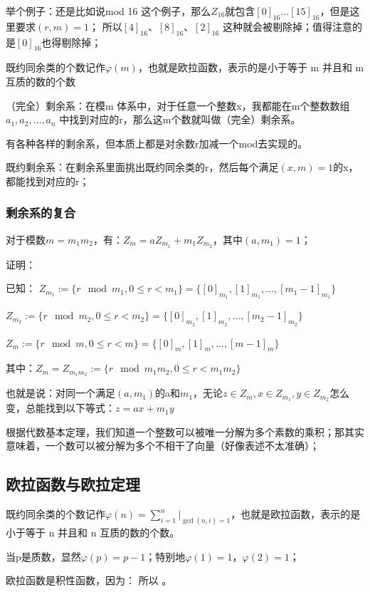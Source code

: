 \documentclass[12pt]{article}
\begin{document}
举个例子：还是比如说mod 16 这个例子，那么$Z_{16}$就包含$[0]_{16} \dots [15]_{16}$，但是这里要求$(r,m)=1$；
所以$[4]_{16}$、$[8]_{16}$、$[2]_{16}$ 这种就会被剔除掉；值得注意的是$[0]_{16}$也得剔除掉；

既约同余类的个数记作$\varphi(m)$，也就是欧拉函数，表示的是小于等于 m 并且和 m 互质的数的个数


（完全）剩余系：在模m 体系中，对于任意一个整数x，我都能在m个整数数组 $a_1,a_2,\dots,a_n$ 中找到对应的r，那么这m个数就叫做（完全）剩余系。

有各种各样的剩余系，但本质上都是对余数r加减一个mod去实现的。

既约剩余系：在剩余系里面挑出既约同余类的r，然后每个满足$(x,m)=1$的x，都能找到对应的r；

\subsubsection{剩余系的复合}

对于模数$m=m_1m_2$，有：$Z_m=aZ_{m_1}+m_1Z_{m_2}$，其中$(a,m_1)=1$；

证明：

已知：
$Z_{m_1}:=\{r\mod m_1,0\leq r < m_1\}=\{[0]_{m_1},[1]_{m_1},\dots,[m_1-1]_{m_1}\}$

$Z_{m_2}:=\{r\mod m_2,0\leq r < m_2\}=\{[0]_{m_2},[1]_{m_2},\dots,[m_2-1]_{m_2}\}$

$Z_{m}:=\{r\mod m,0\leq r < m\}=\{[0]_{m},[1]_{m},\dots,[m-1]_{m}\}$

其中：$Z_{m}=Z_{m_1m_2}:=\{r\mod m_1m_2,0\leq r < m_1m_2\}$

也就是说：对同一个满足$(a,m_1)$的a和$m_1$，无论$z\in Z_m,x\in Z_{m_1},y\in Z_{m_2}$怎么变，总能找到以下等式：$z=ax+m_1y$

根据代数基本定理，我们知道一个整数可以被唯一分解为多个素数的乘积；那其实意味着，一个数可以被分解为多个不相干了向量（好像表述不太准确）；

\subsection{欧拉函数与欧拉定理}


既约同余类的个数记作$\varphi(n)=\sum_{i=1}^{n}|_{\gcd(n,i)=1}$，也就是欧拉函数，表示的是小于等于 n 并且和 n 互质的数的个数。

当p是质数，显然$\varphi(p)=p-1$；特别地$\varphi(1)=1$，$\varphi(2)=1$；

欧拉函数是积性函数，因为： 所以 。
\end{document}

